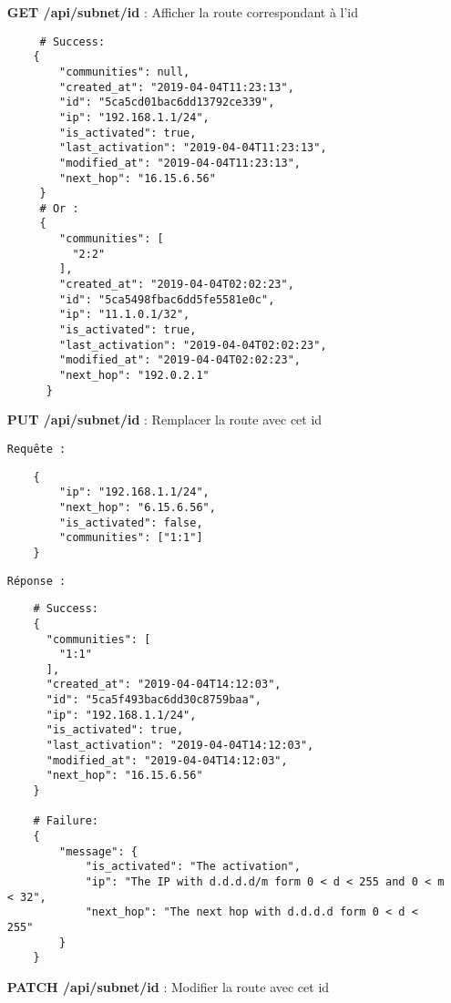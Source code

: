 \begin{itemize}
\begin{verbatim}
    # Failure:
    {
        "message": {
            "ip": "The IP with d.d.d.d/m form 0 < d < 255 and 0 < m < 32",
            "next_hop": "The next hop with d.d.d.d form 0 < d < 255"
        }
    }
    \end{verbatim}

    \item [\textbf{GET /api/subnet/id}] : Afficher la route correspondant à l'id

    \begin{verbatim}
     # Success:
    {
        "communities": null,
        "created_at": "2019-04-04T11:23:13",
        "id": "5ca5cd01bac6dd13792ce339",
        "ip": "192.168.1.1/24",
        "is_activated": true,
        "last_activation": "2019-04-04T11:23:13",
        "modified_at": "2019-04-04T11:23:13",
        "next_hop": "16.15.6.56"
     }
     # Or :
     {
        "communities": [
          "2:2"
        ],
        "created_at": "2019-04-04T02:02:23",
        "id": "5ca5498fbac6dd5fe5581e0c",
        "ip": "11.1.0.1/32",
        "is_activated": true,
        "last_activation": "2019-04-04T02:02:23",
        "modified_at": "2019-04-04T02:02:23",
        "next_hop": "192.0.2.1"
      }
    \end{verbatim}

    \item [\textbf{PUT /api/subnet/id}] : Remplacer la route avec cet id

    \texttt{Requête :}
    \begin{verbatim}
    {
        "ip": "192.168.1.1/24",
        "next_hop": "6.15.6.56",
        "is_activated": false,
        "communities": ["1:1"]
    }
    \end{verbatim}

    \texttt{Réponse :}
    \begin{verbatim}
    # Success:
    {
      "communities": [
        "1:1"
      ],
      "created_at": "2019-04-04T14:12:03",
      "id": "5ca5f493bac6dd30c8759baa",
      "ip": "192.168.1.1/24",
      "is_activated": true,
      "last_activation": "2019-04-04T14:12:03",
      "modified_at": "2019-04-04T14:12:03",
      "next_hop": "16.15.6.56"
    }

    # Failure:
    {
        "message": {
            "is_activated": "The activation",
            "ip": "The IP with d.d.d.d/m form 0 < d < 255 and 0 < m < 32",
            "next_hop": "The next hop with d.d.d.d form 0 < d < 255"
        }
    }
    \end{verbatim}

    \item [\textbf{PATCH /api/subnet/id}] : Modifier la route avec cet id


\end{itemize}
